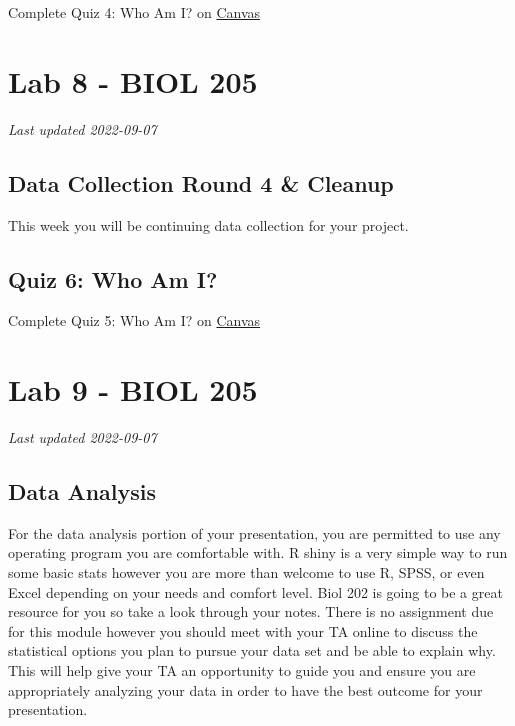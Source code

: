 \documentclass[
]{book}
\begin{document}
Complete Quiz 4: Who Am I? on \href{https://canvas.ubc.ca/courses/113910}{Canvas}

\hypertarget{part-lab-8---biol-205}{%
\part*{Lab 8 - BIOL 205}\label{part-lab-8---biol-205}}

\emph{Last updated 2022-09-07}

\hypertarget{data-collection-round-4-cleanup}{%
\chapter*{Data Collection Round 4 \& Cleanup}\label{data-collection-round-4-cleanup}}

This week you will be continuing data collection for your project.

\hypertarget{quiz-6-who-am-i}{%
\chapter*{Quiz 6: Who Am I?}\label{quiz-6-who-am-i}}

Complete Quiz 5: Who Am I? on \href{https://canvas.ubc.ca/courses/113910}{Canvas}

\hypertarget{part-lab-9---biol-205}{%
\part*{Lab 9 - BIOL 205}\label{part-lab-9---biol-205}}

\emph{Last updated 2022-09-07}

\hypertarget{data-analysis}{%
\chapter*{Data Analysis}\label{data-analysis}}

For the data analysis portion of your presentation, you are permitted to use any operating program you are comfortable with. R shiny is a very simple way to run some basic stats however you are more than welcome to use R, SPSS, or even Excel depending on your needs and comfort level. Biol 202 is going to be a great resource for you so take a look through your notes. There is no assignment due for this module however you should meet with your TA online to discuss the statistical options you plan to pursue your data set and be able to explain why. This will help give your TA an opportunity to guide you and ensure you are appropriately analyzing your data in order to have the best outcome for your presentation.
\end{document}

